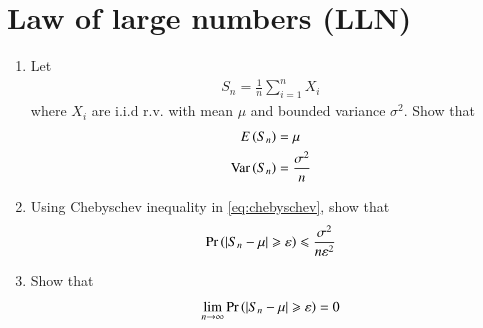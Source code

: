 \documentclass[journal,12pt,twocolumn]{IEEEtran}
\renewcommand\thesection{\arabic{section}}
\begin{document}
\section{Law of large numbers (LLN)}
\begin{enumerate}[label=\thesection.\arabic*,ref=\thesection.\theenumi]
\item Let
\begin{align}
S_n=\frac{1}{n}\sum_{i=1}^{n} X_i 
\end{align}
where $X_i$ are i.i.d r.v. with mean $\mu$  and bounded variance $\sigma^2$.
Show that 
\begin{align}
E\left(S_n\right)&=\mu
\\
\text{Var}\left(S_n\right)&=\frac{\sigma^2}{n}
\end{align}
\item Using Chebyschev inequality in \eqref{eq:chebyschev},  show that 
\begin{align}
\Pr\left(\left\vert S_n-\mu\right\vert\geqslant \varepsilon\right)\leqslant \frac{\sigma^2}{n\varepsilon^2}
\end{align}
\item Show that 
\begin{align}
\lim_{n\to \infty}\Pr\left(\left\vert S_n-\mu\right\vert\geqslant \varepsilon\right) = 0
\end{align}
\end{enumerate}
\end{document}
